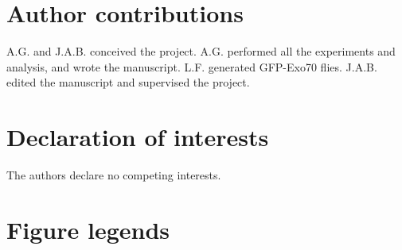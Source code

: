 \documentclass[12pt, twoside, letterpaper]{article}
\begin{document}
\begin{doublespacing}
\begin{linenumbers}
    \section*{Author contributions}
    A.G. and J.A.B. conceived the project.
    A.G. performed all the experiments and analysis, and wrote the manuscript.
    L.F. generated GFP-Exo70 flies.
    J.A.B. edited the manuscript and supervised the project.
    
    \section*{Declaration of interests}
    The authors declare no competing interests.
    

    \section*{Figure legends}
    

\end{linenumbers}
\end{doublespacing}
\end{document}
